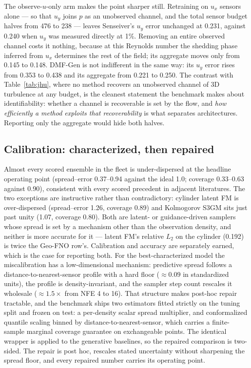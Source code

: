 \documentclass[aip,pof,reprint,amsmath,amssymb,superscriptaddress]{revtex4-1}
\newcommand{\dmfgen}{DMF-Gen}
\begin{document}
The observe-$u$-only arm makes the point sharper still. Retraining on
$u_x$ sensors alone --- so that $u_y$ joins $p$ as an unobserved channel, and
the total sensor budget halves from 476 to 238 --- leaves Senseiver's $u_y$
error unchanged at 0.231, against 0.240 when $u_y$ was measured directly at
1\%. Removing an entire observed channel costs it nothing, because at this
Reynolds number the shedding phase inferred from $u_x$ determines the rest of
the field; its aggregate moves only from 0.145 to 0.148. \dmfgen{} is not
indifferent in the same way: its $u_y$ error rises from 0.353 to 0.438 and its
aggregate from 0.221 to 0.250. The contrast with Table~\ref{tab:jhu}, where no
method recovers an unobserved channel of 3D turbulence at any budget, is the
cleanest statement the benchmark makes about identifiability: whether a
channel is recoverable is set by the flow, and \emph{how efficiently a method
exploits that recoverability} is what separates architectures. Reporting only
the aggregate would hide both halves.

\subsection{Calibration: characterized, then repaired}\label{sec:calibration}

Almost every scored ensemble in the fleet is under-dispersed at the headline
operating point (spread--error 0.37--0.94 against the ideal 1.0; coverage
0.33--0.63 against 0.90), consistent with every scored precedent in adjacent
literatures.\cite{rybchuk2023ensemble,manshausen2025generative} The two
exceptions are instructive rather than contradictory: cylinder latent FM is
over-dispersed (spread--error 1.26, coverage 0.89) and Kolmogorov S3GM sits
just past unity (1.07, coverage 0.80). Both are latent- or guidance-driven
samplers whose spread is set by a mechanism other than the observation
density, and neither is more accurate for it --- latent FM's relative $L_2$ on
the cylinder (0.192) is twice the Geo-FNO row's. Calibration and accuracy are
separately earned, which is the case for reporting both. For the
best-characterized model the miscalibration has a low-dimensional mechanism:
predictive spread follows a distance-to-nearest-sensor profile with a hard
floor (${\approx}0.09$ in standardized units), the profile is
density-invariant, and the sampler step count rescales it wholesale
(${\approx}1.5\times$ from NFE 4 to 16). That structure makes post-hoc repair
tractable, and the benchmark ships two estimators fitted strictly on the
tuning split and frozen on test: a per-density scalar spread multiplier, and
conformalized quantile scaling binned by distance-to-nearest-sensor, which
carries a finite-sample marginal coverage guarantee on exchangeable points.
The identical wrapper is applied to the generative baselines, so the repaired
comparison is two-sided. The repair is post hoc, rescales stated uncertainty
without sharpening the spread floor, and every repaired number carries its
operating point.
\end{document}
